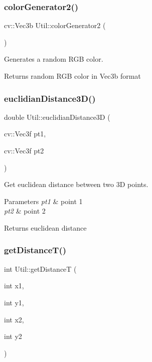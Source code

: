 \subsubsection{\texorpdfstring{color\+Generator2()}{colorGenerator2()}}
{\footnotesize\ttfamily cv\+::\+Vec3b Util\+::color\+Generator2 (\begin{DoxyParamCaption}{ }\end{DoxyParamCaption})\hspace{0.3cm}{\ttfamily [static]}}



Generates a random R\+GB color. 

\begin{DoxyReturn}{Returns}
random R\+GB color in Vec3b format 
\end{DoxyReturn}
\hypertarget{class_util_afcaa0a0b92e0fd117be8dead6a7787f3}{}\label{class_util_afcaa0a0b92e0fd117be8dead6a7787f3} 
\subsubsection{\texorpdfstring{euclidian\+Distance3\+D()}{euclidianDistance3D()}}
{\footnotesize\ttfamily double Util\+::euclidian\+Distance3D (\begin{DoxyParamCaption}\item[{cv\+::\+Vec3f}]{pt1,  }\item[{cv\+::\+Vec3f}]{pt2 }\end{DoxyParamCaption})\hspace{0.3cm}{\ttfamily [static]}}



Get euclidean distance between two 3D points. 


\begin{DoxyParams}{Parameters}
{\em pt1} & point 1 \\
\hline
{\em pt2} & point 2 \\
\hline
\end{DoxyParams}
\begin{DoxyReturn}{Returns}
euclidean distance 
\end{DoxyReturn}
\hypertarget{class_util_a1213364e3ea975aa7f3713f3ad5a96a7}{}\label{class_util_a1213364e3ea975aa7f3713f3ad5a96a7} 
\subsubsection{\texorpdfstring{get\+Distance\+T()}{getDistanceT()}}
{\footnotesize\ttfamily int Util\+::get\+DistanceT (\begin{DoxyParamCaption}\item[{int}]{x1,  }\item[{int}]{y1,  }\item[{int}]{x2,  }\item[{int}]{y2 }\end{DoxyParamCaption})\hspace{0.3cm}{\ttfamily [static]}}




